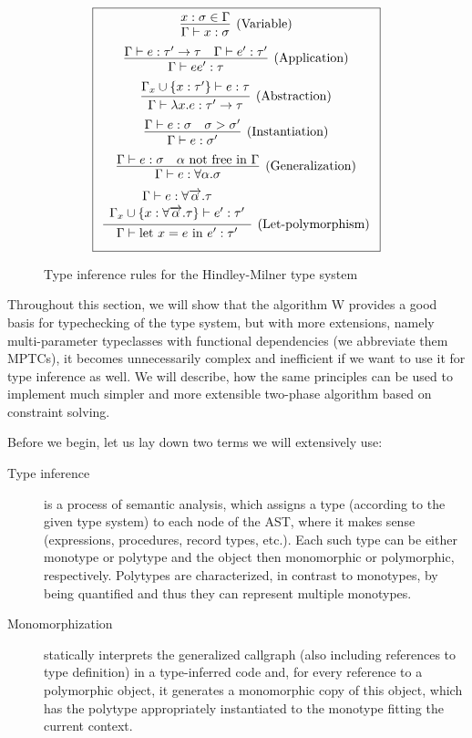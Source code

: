 \begin{figure}
    \caption{Type inference rules for the Hindley-Milner type system}
    \label{fig:wRules}
    $$\boxed{\renewcommand{\arraystretch}{2.2}\begin{array}{cc}
        \infer[\text{(Variable)}]{\Gamma \vdash x : \sigma}{x : \sigma \in \Gamma} \\
        \infer[\text{(Application)}]{\Gamma \vdash e e' : \tau}{\Gamma \vdash e : \tau' \rightarrow \tau & \Gamma \vdash e' : \tau'} \\
        \infer[\text{(Abstraction)}]{\Gamma \vdash \lambda x . e : \tau' \rightarrow \tau}{\Gamma_x \cup \{x : \tau'\} \vdash e : \tau} \\
        \infer[\text{(Instantiation)}]{\Gamma \vdash e : \sigma'}{\Gamma \vdash e : \sigma & \sigma > \sigma'}\\
        \infer[\text{(Generalization)}]{\Gamma \vdash e : \forall \alpha . \sigma}{\Gamma \vdash e : \sigma & \alpha \text{ not free in }\Gamma}\\
        \infer[\text{(Let-polymorphism)}]{\Gamma \vdash \text{let } x = e \text{ in } e' : \tau'}{\renewcommand{\arraystretch}{1.1}\begin{array}{c}\Gamma \vdash e : \forall \vect{\alpha} . \tau \\ \Gamma_x \cup \{x :\forall \vect{\alpha} . \tau \} \vdash e' : \tau'\end{array}}
    \end{array}}$$
\end{figure}

Throughout this section, we will show that the algorithm W provides a good basis for typechecking of the type system, but with more extensions, namely multi-parameter typeclasses with functional dependencies \cite{jones2000type} (we abbreviate them MPTCs), it becomes unnecessarily complex and inefficient if we want to use it for type inference as well. We will describe, how the same principles can be used to implement much simpler and more extensible two-phase algorithm based on constraint solving.

Before we begin, let us lay down two terms we will extensively use:

\begin{description}
\item[Type inference] is a process of semantic analysis, which assigns a type (according to the given type system) to each node of the AST, where it makes sense (expressions, procedures, record types, etc.). Each such type can be either monotype or polytype and the object then monomorphic or polymorphic, respectively. Polytypes are characterized, in contrast to monotypes, by being quantified and thus they can represent multiple monotypes.

\item[Monomorphization] statically interprets the generalized callgraph (also including references to type definition) in a type-inferred code and, for every reference to a polymorphic object, it generates a monomorphic copy of this object, which has the polytype appropriately instantiated to the monotype fitting the current context.
\end{description}

